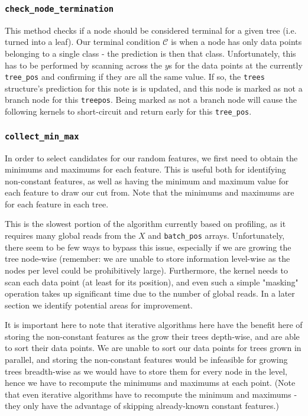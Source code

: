 \documentclass[10pt,conference]{IEEEtran}
\begin{document}
  \subsubsection{\texttt{check\_node\_termination}}
    This method checks if a node should be considered terminal for a given tree (i.e. turned into a leaf). Our terminal condition $\mathcal{C}$ is when a node has only data points belonging to a single class - the prediction is then that class. Unfortunately, this has to be performed by scanning across the $y$s for the data points at the currently \texttt{tree\_pos} and confirming if they are all the same value. If so, the \texttt{trees} structure's prediction for this note is is updated, and this node is marked as not a branch node for this \texttt{treepos}. Being marked as not a branch node will cause the following kernels to short-circuit and return early for this \texttt{tree\_pos}.
   
  \subsubsection{\texttt{collect\_min\_max}}
    In order to select candidates for our random features, we first need to obtain the minimums and maximums for each feature. This is useful both for identifying non-constant features, as well as having the minimum and maximum value for each feature to draw our cut from. Note that the minimums and maximums are for each feature in each tree.
    
    This is the slowest portion of the algorithm currently based on profiling, as it requires many global reads from the $X$ and \texttt{batch\_pos} arrays. Unfortunately, there seem to be few ways to bypass this issue, especially if we are growing the tree node-wise (remember: we are unable to store information level-wise as the nodes per level could be prohibitively large). Furthermore, the kernel needs to scan each data point (at least for its position), and even such a simple "masking" operation takes up significant time due to the number of global reads. In a later section we identify potential areas for improvement.
    
    It is important here to note that iterative algorithms here have the benefit here of storing the non-constant features as the grow their trees depth-wise, and are able to sort their data points. We are unable to sort our data points for trees grown in parallel, and storing the non-constant features would be infeasible for growing trees breadth-wise as we would have to store them for every node in the level, hence we have to recompute the minimums and maximums at each point. (Note that even iterative algorithms have to recompute the minimum and maximums - they only have the advantage of skipping already-known constant features.)
 
\end{document}
